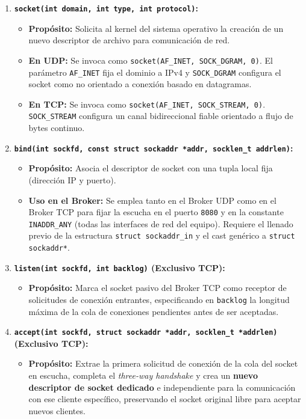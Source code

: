 \documentclass[11pt,a4paper]{article}
\begin{document}
\begin{enumerate}
    \item \textbf{\texttt{socket(int domain, int type, int protocol)}:}
    \begin{itemize}
        \item \textbf{Propósito:} Solicita al kernel del sistema operativo la creación de un nuevo descriptor de archivo para comunicación de red.
        \item \textbf{En UDP:} Se invoca como \texttt{socket(AF\_INET, SOCK\_DGRAM, 0)}. El parámetro \texttt{AF\_INET} fija el dominio a IPv4 y \texttt{SOCK\_DGRAM} configura el socket como no orientado a conexión basado en datagramas.
        \item \textbf{En TCP:} Se invoca como \texttt{socket(AF\_INET, SOCK\_STREAM, 0)}. \texttt{SOCK\_STREAM} configura un canal bidireccional fiable orientado a flujo de bytes continuo.
    \end{itemize}

    \item \textbf{\texttt{bind(int sockfd, const struct sockaddr *addr, socklen\_t addrlen)}:}
    \begin{itemize}
        \item \textbf{Propósito:} Asocia el descriptor de socket con una tupla local fija (dirección IP y puerto).
        \item \textbf{Uso en el Broker:} Se emplea tanto en el Broker UDP como en el Broker TCP para fijar la escucha en el puerto \texttt{8080} y en la constante \texttt{INADDR\_ANY} (todas las interfaces de red del equipo). Requiere el llenado previo de la estructura \texttt{struct sockaddr\_in} y el cast genérico a \texttt{struct sockaddr*}.
    \end{itemize}

    \item \textbf{\texttt{listen(int sockfd, int backlog)} (Exclusivo TCP):}
    \begin{itemize}
        \item \textbf{Propósito:} Marca el socket pasivo del Broker TCP como receptor de solicitudes de conexión entrantes, especificando en \texttt{backlog} la longitud máxima de la cola de conexiones pendientes antes de ser aceptadas.
    \end{itemize}

    \item \textbf{\texttt{accept(int sockfd, struct sockaddr *addr, socklen\_t *addrlen)} (Exclusivo TCP):}
    \begin{itemize}
        \item \textbf{Propósito:} Extrae la primera solicitud de conexión de la cola del socket en escucha, completa el \textit{three-way handshake} y crea un \textbf{nuevo descriptor de socket dedicado} e independiente para la comunicación con ese cliente específico, preservando el socket original libre para aceptar nuevos clientes.
    \end{itemize}


\end{enumerate}
\end{document}
